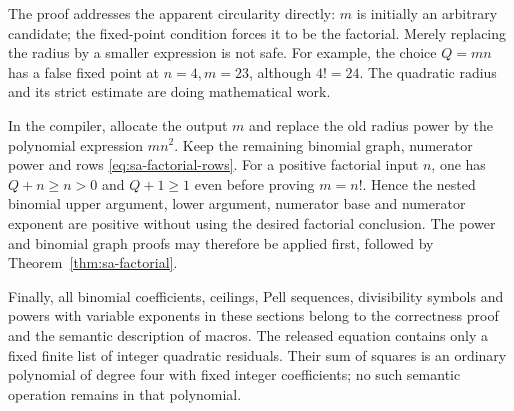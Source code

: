 The proof addresses the apparent circularity directly: $m$ is initially
an arbitrary candidate; the fixed-point condition forces it to be the
factorial.  Merely replacing the radius by a smaller expression is not
safe.  For example, the choice $Q=mn$ has a false fixed point at
$n=4,m=23$, although $4!=24$.  The quadratic radius and its strict
estimate are doing mathematical work.

In the compiler, allocate the output $m$ and replace the old radius
power by the polynomial expression $mn^2$.  Keep the remaining
binomial graph, numerator power and rows
\eqref{eq:sa-factorial-rows}.  For a positive factorial input $n$,
one has $Q+n\geq n>0$ and $Q+1\geq1$ even before proving $m=n!$.
Hence the nested binomial upper argument, lower argument, numerator
base and numerator exponent are positive without using the desired
factorial conclusion.  The power and binomial graph proofs may therefore
be applied first, followed by Theorem~\ref{thm:sa-factorial}.

Finally, all binomial coefficients, ceilings, Pell sequences, divisibility
symbols and powers with variable exponents in these sections belong to
the correctness proof and the semantic description of macros.  The
released equation contains only a fixed finite list of integer quadratic
residuals.  Their sum of squares is an ordinary polynomial of degree
four with fixed integer coefficients; no such semantic operation remains
in that polynomial.

